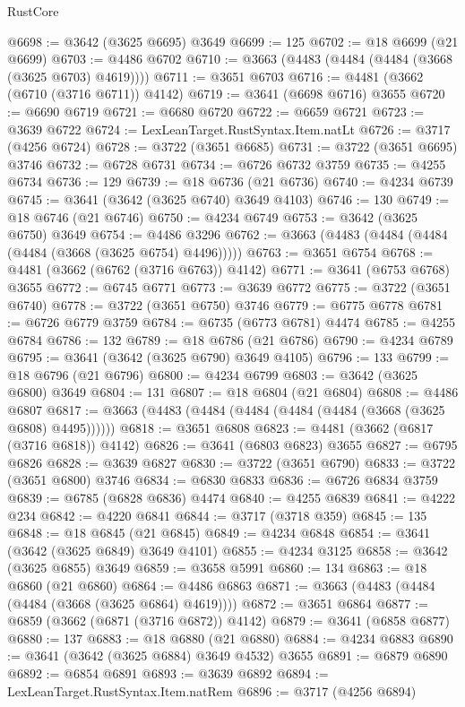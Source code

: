 \begin{lexlean}{RustCore}
\begin{coremodule}
@6698 := @3642 (@3625 @6695) @3649
@6699 := 125
@6702 := @18 @6699 (@21 @6699)
@6703 := @4486 @6702
@6710 := @3663 (@4483 (@4484 (@4484 (@3668 (@3625 @6703) @4619))))
@6711 := @3651 @6703
@6716 := @4481 (@3662 (@6710 (@3716 @6711)) @4142)
@6719 := @3641 (@6698 @6716) @3655
@6720 := @6690 @6719
@6721 := @6680 @6720
@6722 := @6659 @6721
@6723 := @3639 @6722
@6724 := LexLeanTarget.RustSyntax.Item.natLt
@6726 := @3717 (@4256 @6724)
@6728 := @3722 (@3651 @6685)
@6731 := @3722 (@3651 @6695) @3746
@6732 := @6728 @6731
@6734 := @6726 @6732 @3759
@6735 := @4255 @6734
@6736 := 129
@6739 := @18 @6736 (@21 @6736)
@6740 := @4234 @6739
@6745 := @3641 (@3642 (@3625 @6740) @3649 @4103)
@6746 := 130
@6749 := @18 @6746 (@21 @6746)
@6750 := @4234 @6749
@6753 := @3642 (@3625 @6750) @3649
@6754 := @4486 @3296
@6762 := @3663 (@4483 (@4484 (@4484 (@4484 (@3668 (@3625 @6754) @4496)))))
@6763 := @3651 @6754
@6768 := @4481 (@3662 (@6762 (@3716 @6763)) @4142)
@6771 := @3641 (@6753 @6768) @3655
@6772 := @6745 @6771
@6773 := @3639 @6772
@6775 := @3722 (@3651 @6740)
@6778 := @3722 (@3651 @6750) @3746
@6779 := @6775 @6778
@6781 := @6726 @6779 @3759
@6784 := @6735 (@6773 @6781) @4474
@6785 := @4255 @6784
@6786 := 132
@6789 := @18 @6786 (@21 @6786)
@6790 := @4234 @6789
@6795 := @3641 (@3642 (@3625 @6790) @3649 @4105)
@6796 := 133
@6799 := @18 @6796 (@21 @6796)
@6800 := @4234 @6799
@6803 := @3642 (@3625 @6800) @3649
@6804 := 131
@6807 := @18 @6804 (@21 @6804)
@6808 := @4486 @6807
@6817 := @3663 (@4483 (@4484 (@4484 (@4484 (@4484 (@3668 (@3625 @6808) @4495))))))
@6818 := @3651 @6808
@6823 := @4481 (@3662 (@6817 (@3716 @6818)) @4142)
@6826 := @3641 (@6803 @6823) @3655
@6827 := @6795 @6826
@6828 := @3639 @6827
@6830 := @3722 (@3651 @6790)
@6833 := @3722 (@3651 @6800) @3746
@6834 := @6830 @6833
@6836 := @6726 @6834 @3759
@6839 := @6785 (@6828 @6836) @4474
@6840 := @4255 @6839
@6841 := @4222 @234
@6842 := @4220 @6841
@6844 := @3717 (@3718 @359)
@6845 := 135
@6848 := @18 @6845 (@21 @6845)
@6849 := @4234 @6848
@6854 := @3641 (@3642 (@3625 @6849) @3649 @4101)
@6855 := @4234 @3125
@6858 := @3642 (@3625 @6855) @3649
@6859 := @3658 @5991
@6860 := 134
@6863 := @18 @6860 (@21 @6860)
@6864 := @4486 @6863
@6871 := @3663 (@4483 (@4484 (@4484 (@3668 (@3625 @6864) @4619))))
@6872 := @3651 @6864
@6877 := @6859 (@3662 (@6871 (@3716 @6872)) @4142)
@6879 := @3641 (@6858 @6877)
@6880 := 137
@6883 := @18 @6880 (@21 @6880)
@6884 := @4234 @6883
@6890 := @3641 (@3642 (@3625 @6884) @3649 @4532) @3655
@6891 := @6879 @6890
@6892 := @6854 @6891
@6893 := @3639 @6892
@6894 := LexLeanTarget.RustSyntax.Item.natRem
@6896 := @3717 (@4256 @6894)

\end{coremodule}
\end{lexlean}
